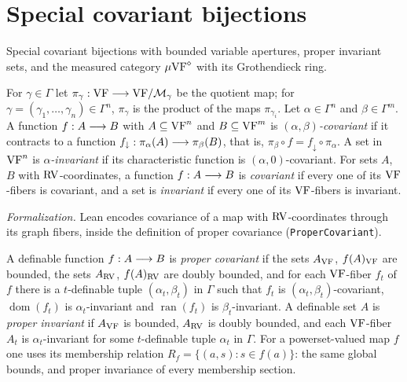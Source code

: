 \section{Special covariant bijections}
\label{section-6}
Special covariant bijections with bounded variable apertures, proper invariant sets, and the measured category $\mu\mathrm{VF}^{\diamond}$ with its Grothendieck ring.

\setcounter{theorem}{0}
\begin{definition}
\label{defn-binv}
\leanok
{}
For $\gamma\in\Gamma$ let $\pi_\gamma:\mathrm{VF}\longrightarrow\mathrm{VF}/\mathcal{M}_\gamma$ be the quotient map; for $\gamma=(\gamma_1,\ldots,\gamma_n)\in\Gamma^n$, $\pi_\gamma$ is the product of the maps $\pi_{\gamma_i}$. Let $\alpha\in\Gamma^n$ and $\beta\in\Gamma^m$. A function $f:A\longrightarrow B$ with $A\subseteq\mathrm{VF}^n$ and $B\subseteq\mathrm{VF}^m$ is \emph{$(\alpha,\beta)$-covariant} if it contracts to a function $f_\downarrow:\pi_\alpha(A)\longrightarrow\pi_\beta(B)$, that is, $\pi_\beta\circ f=f_\downarrow\circ\pi_\alpha$. A set in $\mathrm{VF}^n$ is \emph{$\alpha$-invariant} if its characteristic function is $(\alpha,0)$-covariant. For sets $A$, $B$ with $\mathrm{RV}$-coordinates, a function $f:A\longrightarrow B$ is \emph{covariant} if every one of its $\mathrm{VF}$-fibers is covariant, and a set is \emph{invariant} if every one of its $\mathrm{VF}$-fibers is invariant.

\emph{Formalization.} Lean encodes covariance of a map with $\mathrm{RV}$-coordinates through its graph fibers, inside the definition of proper covariance (\texttt{ProperCovariant}).
\end{definition}

\setcounter{theorem}{1}
\begin{definition}
\label{prop-pseu}
\leanok
{}
A definable function $f:A\longrightarrow B$ is \emph{proper covariant} if the sets $A_{\mathrm{VF}}$, $f(A)_{\mathrm{VF}}$ are bounded, the sets $A_{\mathrm{RV}}$, $f(A)_{\mathrm{RV}}$ are doubly bounded, and for each $\mathrm{VF}$-fiber $f_t$ of $f$ there is a $t$-definable tuple $(\alpha_t,\beta_t)$ in $\Gamma$ such that $f_t$ is $(\alpha_t,\beta_t)$-covariant, $\operatorname{dom}(f_t)$ is $\alpha_t$-invariant and $\operatorname{ran}(f_t)$ is $\beta_t$-invariant. A definable set $A$ is \emph{proper invariant} if $A_{\mathrm{VF}}$ is bounded, $A_{\mathrm{RV}}$ is doubly bounded, and each $\mathrm{VF}$-fiber $A_t$ is $\alpha_t$-invariant for some $t$-definable tuple $\alpha_t$ in $\Gamma$. For a powerset-valued map $f$ one uses its membership relation $R_f=\{(a,s):s\in f(a)\}$: the same global bounds, and proper invariance of every membership section.
\end{definition}

